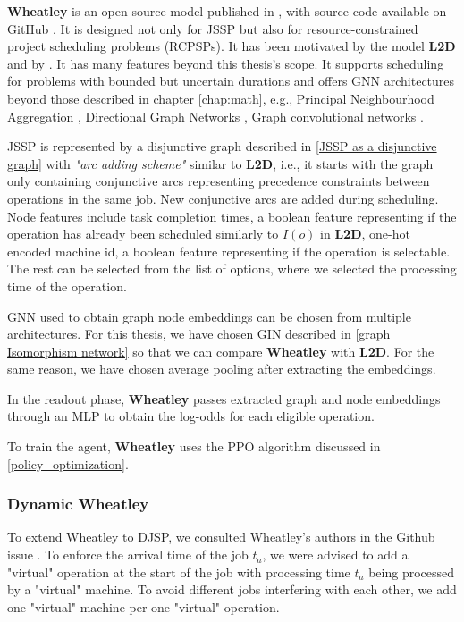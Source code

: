 \textbf{Wheatley} is an open-source model published in \cite{wheatley}, with source code available on GitHub \cite{github_wheatley}. It is designed not only for JSSP but also for resource-constrained project scheduling problems (RCPSPs). It has been motivated by the model \textbf{L2D} and by \cite{DBLP:journals/corr/abs-2104-03760}. It has many features beyond this thesis's scope. It supports scheduling for problems with bounded but uncertain durations and offers GNN architectures beyond those described in chapter \ref{chap:math}, e.g., Principal Neighbourhood Aggregation \cite{DBLP:journals/corr/abs-2004-05718}, Directional Graph Networks \cite{DBLP:journals/corr/abs-2010-02863}, Graph convolutional networks \cite{DBLP:journals/corr/abs-2007-02133}.
\par
JSSP is represented by a disjunctive graph described in \ref{JSSP as a disjunctive graph} with \textit{"arc adding scheme"} similar to \textbf{L2D}, i.e., it starts with the graph only containing conjunctive arcs representing precedence constraints between operations in the same job. New conjunctive arcs are added during scheduling. Node features include task completion times, a boolean feature representing if the operation has already been scheduled similarly to $I(o)$ in \textbf{L2D}, one-hot encoded machine id, a boolean feature representing if the operation is selectable. The rest can be selected from the list of options, where we selected the processing time of the operation.
\par
GNN used to obtain graph node embeddings can be chosen from multiple architectures. For this thesis, we have chosen GIN described in \ref{graph Isomorphism network} so that we can compare \textbf{Wheatley} with \textbf{L2D}. For the same reason, we have chosen average pooling after extracting the embeddings.
\par
In the readout phase, \textbf{Wheatley} passes extracted graph and node embeddings through an MLP to obtain the log-odds for each eligible operation.
\par
To train the agent, \textbf{Wheatley} uses the PPO algorithm discussed in \ref{policy_optimization}.

\subsubsection*{Dynamic Wheatley}
To extend Wheatley to DJSP, we consulted Wheatley's authors in the Github issue \cite{github_wheatley_djsp}. To enforce the arrival time of the job $t_a$, we were advised to add a "virtual" operation at the start of the job with processing time $t_a$ being processed by a "virtual" machine. To avoid different jobs interfering with each other, we add one "virtual" machine per one "virtual" operation.

